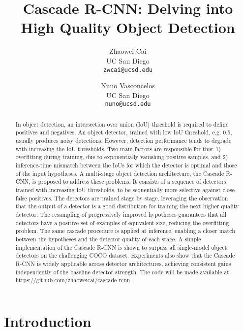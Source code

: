 \documentclass[10pt,twocolumn,letterpaper]{article}
\begin{document}
\title{Cascade R-CNN: Delving into High Quality Object Detection}

\author{Zhaowei Cai\\
UC San Diego\\
{\tt\small zwcai@ucsd.edu}
\and
Nuno Vasconcelos\\
UC San Diego\\
{\tt\small nuno@ucsd.edu}
}

\maketitle


\begin{abstract}
In object detection, an intersection over union (IoU) threshold is required to define positives and negatives. An object detector, trained with low IoU threshold, e.g. 0.5, usually produces noisy detections. However, detection performance tends to degrade with increasing the IoU thresholds. Two main factors are responsible for this: 1) overfitting during training, due to exponentially vanishing positive samples, and 2) inference-time mismatch between the IoUs for which the detector is optimal and those of the input hypotheses. A multi-stage object detection architecture, the Cascade R-CNN, is proposed to address these problems. It consists of a sequence of detectors trained with increasing IoU thresholds, to be sequentially more selective against close false positives. The detectors are trained stage by stage, leveraging the observation that the output of a detector is a good distribution for training the next higher quality detector. The resampling of progressively improved hypotheses guarantees that all detectors have a positive set of examples of equivalent size, reducing the overfitting problem. The same cascade procedure is applied at inference, enabling a closer match between the hypotheses and the detector quality of each stage. A simple implementation of the Cascade R-CNN is shown to surpass all single-model object detectors on the challenging COCO dataset. Experiments also show that the Cascade R-CNN is widely applicable across detector architectures, achieving consistent gains independently of the baseline detector strength. The code will be made available at https://github.com/zhaoweicai/cascade-rcnn.
\end{abstract}



\section{Introduction}
\label{sec:intro}
\end{document}
